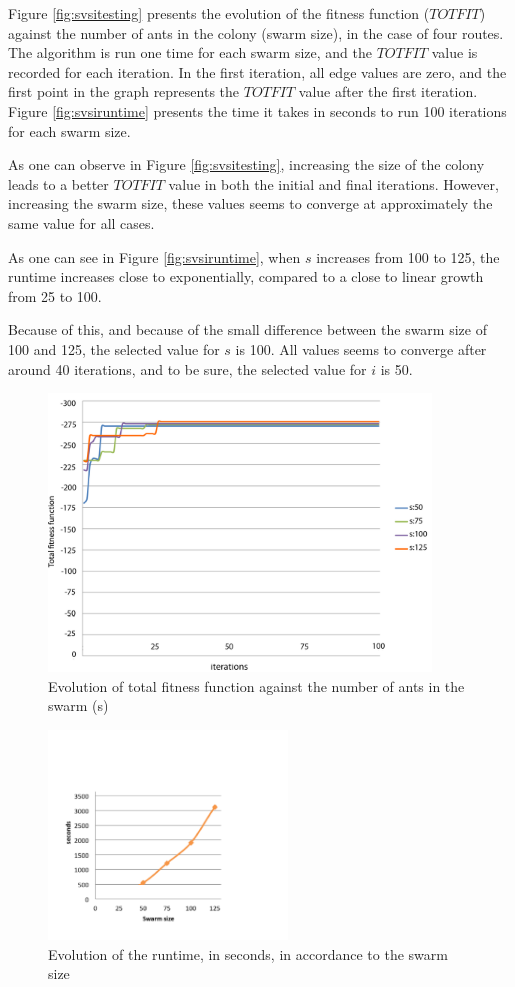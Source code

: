 Figure \vref{fig:svsitesting} presents the evolution of the fitness function ($TOTFIT$) against the number of ants in the colony (swarm size), in the case of four routes. The algorithm is run one time for each swarm size, and the $TOTFIT$ value is recorded for each iteration. In the first iteration, all edge values are zero, and the first point in the graph represents the $TOTFIT$ value after the first iteration. Figure \vref{fig:svsiruntime} presents the time it takes in seconds to run 100 iterations for each swarm size. 

As one can observe in Figure \vref{fig:svsitesting}, increasing the size of the colony leads to a better $TOTFIT$ value in both the initial and final iterations. However, increasing the swarm size, these values seems to converge at approximately the same value for all cases.

As one can see in Figure \vref{fig:svsiruntime}, when $s$ increases from 100 to 125, the runtime increases close to exponentially, compared to a close to linear growth from 25 to 100.

Because of this, and because of the small difference between the swarm size of 100 and 125, the selected value for $s$ is 100. All values seems to converge after around 40 iterations, and to be sure, the selected value for $i$ is 50.

\begin{figure}[H]
\begin{center}
  \includegraphics[width=4in]{assets/svsitest.png}
  \end{center}
  \caption{Evolution of total fitness function against the number of ants in the swarm (s)}
  \label{fig:svsitesting} 
\end{figure}

\begin{figure}[H]
\begin{center}
  \includegraphics[width=2.5in]{assets/svsiruntime.png}
  \end{center}
  \caption{Evolution of the runtime, in seconds, in accordance to the swarm size}
  \label{fig:svsiruntime} 
\end{figure}
